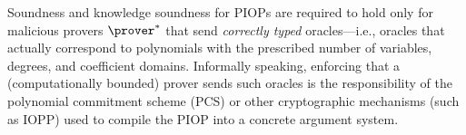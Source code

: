 



\begin{remark}
\label{rem:zinc-oracle_typing}
Soundness and knowledge soundness for PIOPs are required to hold only for malicious provers $\prover^*$ that send \emph{correctly typed} oracles---i.e., oracles that actually correspond to polynomials with the prescribed number of variables, degrees, and coefficient domains. Informally speaking, enforcing that a (computationally bounded) prover sends such oracles is the responsibility of the polynomial commitment scheme (PCS) or other cryptographic mechanisms (such as IOPP) used to compile the PIOP into a concrete argument system.
\end{remark}





